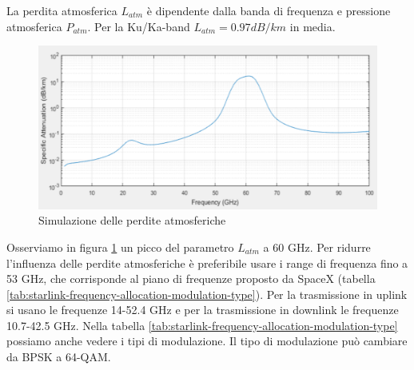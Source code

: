 



La perdita atmosferica $L_{atm}$ è dipendente dalla banda di frequenza e pressione atmosferica $P_{atm}$.
Per la Ku/Ka-band $L_{atm} = 0.97 dB/km$ in media.

\begin{figure}[htbp]
  \centering
  \includegraphics[width=0.8\linewidth]{./res/img/atmospheric_losses_simulation.png}
  \caption{Simulazione delle perdite atmosferiche}
  \label{fig:atmospheric-losses-simulation}
\end{figure}

Osserviamo in figura \ref{fig:atmospheric-losses-simulation} un picco del parametro $L_{atm}$ a 60 GHz.
Per ridurre l'influenza delle perdite atmosferiche è preferibile usare i range di frequenza fino a 53 GHz, che corrisponde al piano di frequenze proposto da SpaceX (tabella \ref{tab:starlink-frequency-allocation-modulation-type}).
Per la trasmissione in uplink si usano le frequenze 14-52.4 GHz e per la trasmissione in downlink le frequenze 10.7-42.5 GHz.
Nella tabella \ref{tab:starlink-frequency-allocation-modulation-type} possiamo anche vedere i tipi di modulazione.
Il tipo di modulazione può cambiare da \ac{BPSK} a 64-\ac{QAM}.

